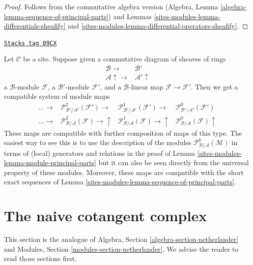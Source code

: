 \begin{proof}
Follows from the commutative algebra version
(Algebra, Lemma \ref{algebra-lemma-sequence-of-principal-parts})
and Lemmas \ref{sites-modules-lemma-differentials-sheafify} and
\ref{sites-modules-lemma-differential-operators-sheafify}.
\end{proof}

\begin{remark}
\label{sites-modules-remark-functoriality-principal-parts}
\href{https://stacks.math.columbia.edu/tag/09CX}{\texttt{Stacks tag 09CX}}

Let $\mathcal{C}$ be a site. Suppose given a commutative diagram of
sheaves of rings
$$
\begin{array}{cc}\mathcal{B} \longrightarrow & \mathcal{B}' \\ \mathcal{A} \uparrow\longrightarrow & \mathcal{A}' \uparrow\end{array}
$$
a $\mathcal{B}$-module $\mathcal{F}$, a $\mathcal{B}'$-module $\mathcal{F}'$,
and a $\mathcal{B}$-linear map $\mathcal{F} \to \mathcal{F}'$.
Then we get a compatible system of module maps
$$
\begin{array}{cccc}\ldots \longrightarrow & \mathcal{P}^2_{\mathcal{B}'/\mathcal{A}'}(\mathcal{F}') \longrightarrow & \mathcal{P}^1_{\mathcal{B}'/\mathcal{A}'}(\mathcal{F}') \longrightarrow & \mathcal{P}^0_{\mathcal{B}'/\mathcal{A}'}(\mathcal{F}') \\ \ldots \longrightarrow & \mathcal{P}^2_{\mathcal{B}/\mathcal{A}}(\mathcal{F}) \longrightarrow\uparrow & \mathcal{P}^1_{\mathcal{B}/\mathcal{A}}(\mathcal{F}) \longrightarrow\uparrow & \mathcal{P}^0_{\mathcal{B}/\mathcal{A}}(\mathcal{F}) \uparrow\end{array}
$$
These maps are compatible with further composition of maps of this type.
The easiest way to see this is to use the description of the modules
$\mathcal{P}^k_{\mathcal{B}/\mathcal{A}}(\mathcal{M})$ in terms of
(local) generators and relations in the proof of
Lemma \ref{sites-modules-lemma-module-principal-parts} but it can also be seen
directly from the universal
property of these modules. Moreover, these maps are compatible with
the short exact sequences of Lemma \ref{sites-modules-lemma-sequence-of-principal-parts}.
\end{remark}

\section{The naive cotangent complex}
\label{sites-modules-section-netherlander}
This section is the analogue of
Algebra, Section \ref{algebra-section-netherlander}
and
Modules, Section \ref{modules-section-netherlander}.
We advise the reader to read those sections first.

